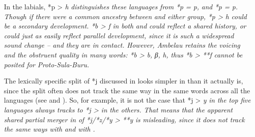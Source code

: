 In the labials,  *p > \it{h} distinguishes these
languages from  *p = \it{p},
and  *p = \it{p}.
Though if there were a common ancestry between 
and either group, *p > \it{h} could be a secondary development.
*b > \it{f} in both 
and  could reflect a shared history,
or could just as easily reflect parallel development,
since it is such a widespread sound change -- and they are in contact.
However, Ambelau retains the voicing
and the obstruent quality in many words: *b > \it{b,
β, h}, thus *b > **f cannot be posited for Proto-Sula-Buru.

The lexically specific split of *j discussed in  looks
simpler in  than it actually is,
since the split often does not track the same way in the same
words across all the languages (see  and ).
So, for example, it is not the case that *j > \it{y} in the top
five languages always tracks to *j > {\0} in the others.
That means that the apparent shared partial merger in 
of *j/*z/*y > **y is misleading,
since it does not track the same ways with  and with .


